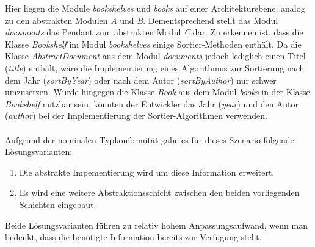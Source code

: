 \documentclass[11pt, 
ngerman,
doublespacing,
chapterinoneline, %
consistentlayout, %
]{scrartcl}
\begin{document}
Hier liegen die Module \emph{bookshelves} und \emph{books} auf einer Architekturebene, analog zu den abstrakten Modulen \emph{A} und \emph{B}. Dementsprechend stellt das Modul \emph{documents} das Pendant zum abstrakten Modul \emph{C} dar. Zu erkennen ist, dass die Klasse \emph{Bookshelf} im Modul \emph{bookshelves} einige Sortier-Methoden enthält. Da die Klasse \emph{AbstractDocument} aus dem Modul \emph{documents} jedoch lediglich einen Titel (\emph{title}) enthält, wäre die Implementierung eines Algorithmus zur Sortierung nach dem Jahr (\emph{sortByYear}) oder nach dem Autor (\emph{sortByAuthor}) nur schwer umzusetzen. Würde hingegen die Klasse \emph{Book} aus dem Modul \emph{books} in der Klasse \emph{Bookshelf} nutzbar sein, könnten der Entwickler das Jahr (\emph{year}) und den Autor (\emph{author}) bei der Implementierung der Sortier-Algorithmen verwenden.\\\\
Aufgrund der nominalen Typkonformität gäbe es für dieses Szenario folgende Lösungs\-varianten:
\begin{enumerate}
\item Die abstrakte Impementierung wird um diese Information erweitert.
\item Es wird eine weitere Abstraktionsschicht zwischen den beiden vorliegenden Schichten eingebaut.
\end{enumerate}
Beide Lösungsvarianten führen zu relativ hohem Anpassungsaufwand, wenn man bedenkt, dass die benötigte Information bereits zur Verfügung steht.
\end{document}
